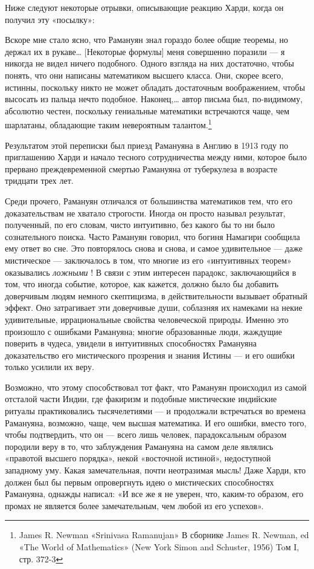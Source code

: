 \documentclass[../main.tex]{subfiles}
\begin{document}
Ниже следуют некоторые отрывки, описывающие реакцию Харди, когда он получил эту «посылку»:

Вскоре мне стало ясно, что Рамануян знал гораздо более общие теоремы, но держал их в рукаве\ldots{} {[}Некоторые формулы{]} меня совершенно поразили --- я никогда не видел ничего подобного. Одного взгляда на них достаточно, чтобы понять, что они написаны математиком высшего класса. Они, скорее всего, истинны, поскольку никто не может обладать достаточным воображением, чтобы высосать из пальца нечто подобное. Наконец,\ldots{} автор письма был, по-видимому, абсолютно честен, поскольку гениальные математики встречаются чаще, чем шарлатаны, обладающие таким невероятным талантом.\footnote{James R. Newman «Srinivasa Ramanujan» В сборнике James R. Newman, ed «The World of Mathematics» (New York Simon and Schuster, 1956) Toм I, стр. 372-3}

Результатом этой переписки был приезд Рамануяна в Англию в 1913 году по приглашению Харди и начало тесного сотрудничества между ними, которое было прервано преждевременной смертью Рамануяна от туберкулеза в возрасте тридцати трех лет.

Среди прочего, Рамануян отличался от большинства математиков тем, что его доказательствам не хватало строгости. Иногда он просто называл результат, полученный, по его словам, чисто интуитивно, без какого бы то ни было сознательного поиска. Часто Рамануян говорил, что богиня Намагири сообщила ему ответ во сне. Это повторялось снова и снова, и самое удивительное --- даже мистическое --- заключалось в том, что многие из его «интуитивных теорем» оказывались \emph{ложными} ! В связи с этим интересен парадокс, заключающийся в том, что иногда событие, которое, как кажется, должно было бы добавить доверчивым людям немного скептицизма, в действительности вызывает обратный эффект. Оно затрагивает эти доверчивые души, соблазняя их намеками на некие удивительные, иррациональные свойства человеческой природы. Именно это произошло с ошибками Рамануяна; многие образованные люди, жаждущие поверить в чудеса, увидели в интуитивных способностях Рамануяна доказательство его мистического прозрения и знания Истины --- и его ошибки только усилили их веру.

Возможно, что этому способствовал тот факт, что Рамануян происходил из самой отсталой части Индии, где факиризм и подобные мистические индийские ритуалы практиковались тысячелетиями --- и продолжали встречаться во времена Рамануяна, возможно, чаще, чем высшая математика. И его ошибки, вместо того, чтобы подтвердить, что он --- всего лишь человек, парадоксальным образом породили веру в то, что заблуждения Рамануяна на самом деле являлись «правотой высшего порядка», некой «восточной истиной», недоступной западному уму. Какая замечательная, почти неотразимая мысль! Даже Харди, кто должен был бы первым опровергнуть идею о мистических способностях Рамануяна, однажды написал: «И все же я не уверен, что, каким-то образом, его промах не является более замечательным, чем любой из его успехов».
\end{document}
